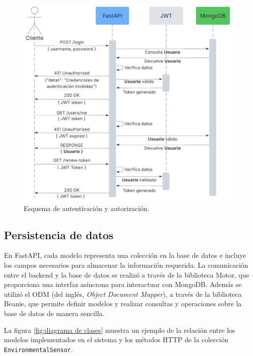 \begin{figure}[H]
    \centering
    \includegraphics[width=.80\textwidth]{./Images/17.png}
    \caption{Esquema de autenticación y autorización.}
    \label{fig:esquema autenticacion}
\end{figure}

\subsection{Persistencia de datos}

En FastAPI, cada modelo representa una colección en la base de datos e incluye
los campos necesarios para almacenar la información requerida. La comunicación
entre el backend y la base de datos se realizó a través de la biblioteca Motor,
que proporciona una interfaz asíncrona para interactuar con MongoDB. Además se
utilizó el ODM (del inglés, \textit{Object Document Mapper}), a través de la
biblioteca Beanie, que permite definir modelos y realizar consultas y
operaciones sobre la base de datos de manera sencilla.


La figura \ref{fig:diagrama de clases} muestra un ejemplo de la relación entre
los modelos implementados en el sistema y los métodos HTTP de la colección
\texttt{EnvironmentalSensor}.

